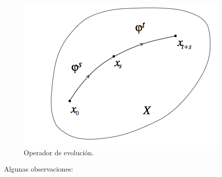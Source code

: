 \documentclass[11pt]{book}
\theoremstyle{definition}
\numberwithin{definition}{section}
\theoremstyle{theorem}
\numberwithin{theorem}{section}
\numberwithin{lemma}{section}
\numberwithin{corollary}{section}
\theoremstyle{plain}
\numberwithin{example}{section}
\begin{document}
\begin{figure} \label{fig:evolutionoperator} \centering
    \includegraphics[scale=0.5]{figures/evolutionoperator.png}    
    \caption{Operador de evolución.}
\end{figure}

Algunas observaciones:
\end{document}
